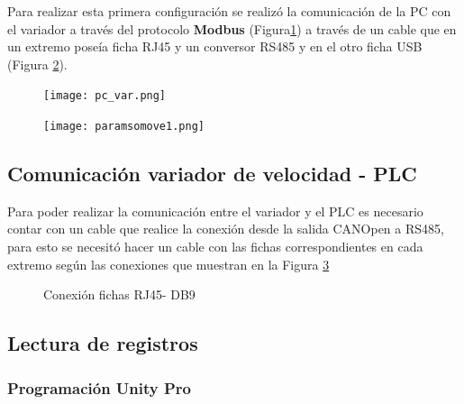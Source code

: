 Para realizar esta primera configuración se realizó la comunicación de la PC con el variador a través del protocolo \textbf{Modbus} (Figura\ref{fig:pcvar}) a través de un cable que en un extremo poseía ficha RJ45 y un conversor RS485 y en el otro ficha USB (Figura \ref{fig:paramsomove1}). 
\begin{figure}[H]
	\centering
	\texttt{[image: pc\_var.png]}
	\label{fig:pcvar}
\end{figure}

\begin{figure}[H]
	\centering
	\texttt{[image: paramsomove1.png]}
	\label{fig:paramsomove1}
\end{figure}


\subsection{Comunicación variador de velocidad - PLC}
Para poder realizar la comunicación entre el variador y el PLC es necesario contar con un cable que realice la conexión desde la salida CANOpen a RS485, para esto se necesitó hacer un cable con las fichas correspondientes en cada extremo según las conexiones que muestran en la Figura \ref{fig:cable}

\begin{figure}[htbp]
    \centering
    \caption{Conexión fichas RJ45- DB9} \label{fig:cable}
    \end{figure}


\subsection{Lectura de registros}


\subsubsection{Programación Unity Pro}


